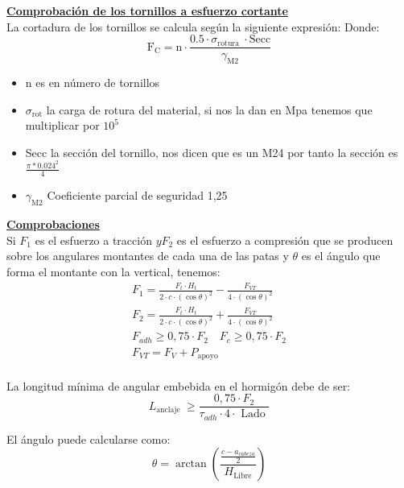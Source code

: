 \documentclass{article}
\begin{document}
            \newpage
            \textbf{\underline{Comprobación de los tornillos a esfuerzo cortante}} 
            \\
            
La cortadura de los tornillos se calcula según la siguiente expresión:
Donde:
$$
\mathrm{F}_{\mathrm{C}}=\mathrm{n} \cdot \frac{0.5 \cdot \sigma_{\text {rotura }} \cdot \mathrm{Secc}}{\gamma_{\mathrm{M} 2}}
$$
\begin{itemize}
    \item n es en número de tornillos
\item$\sigma_{\mathrm{rot}}$ la carga de rotura del material, si nos la dan en Mpa tenemos que multiplicar por $10^5$
\item Secc la sección del tornillo, nos dicen que es un M24 por tanto la sección es $\frac{\pi*0.024^2}{4}$
\item$\gamma_{\mathrm{M} 2}$ Coeficiente parcial de seguridad 1,25
\end{itemize}

\textbf{\underline{Comprobaciones}} 
            \\

            Si $F_{1}$ es el esfuerzo a tracción $y F_{2}$ es el esfuerzo a compresión que se producen sobre los angulares montantes de cada una de las patas y $\theta$ es el ángulo que forma el montante con la vertical, tenemos:
$$
\begin{array}{c}
F_{1}=\frac{F_{t} \cdot H_{t}}{2 \cdot c \cdot(\cos \theta)^{2}}-\frac{F_{V T}}{4 \cdot(\cos \theta)^{2}} \\
F_{2}=\frac{F_{t} \cdot H_{t}}{2 \cdot c \cdot(\cos \theta)^{2}}+\frac{F_{V T}}{4 \cdot(\cos \theta)^{2}} \\
F_{a d h} \geq 0,75 \cdot F_{2} \quad F_{c} \geq 0,75 \cdot F_{2}\\
F_{V T}=F_{V}+P_{\text {apoyo }}
\end{array} 
$$
\\

La longitud mínima de angular embebida en el hormigón debe de ser:
$$
L_{\text {anclaje }} \geq \frac{0,75 \cdot F_{2}}{\tau_{a d h} \cdot 4 \cdot \text { Lado }}
$$

El ángulo puede calcularse como:
$$
\theta=\arctan \left(\frac{\frac{c-a_{cabeza}}{2}}{H_{\mathrm{Libre}}}\right)
$$
\end{document}
